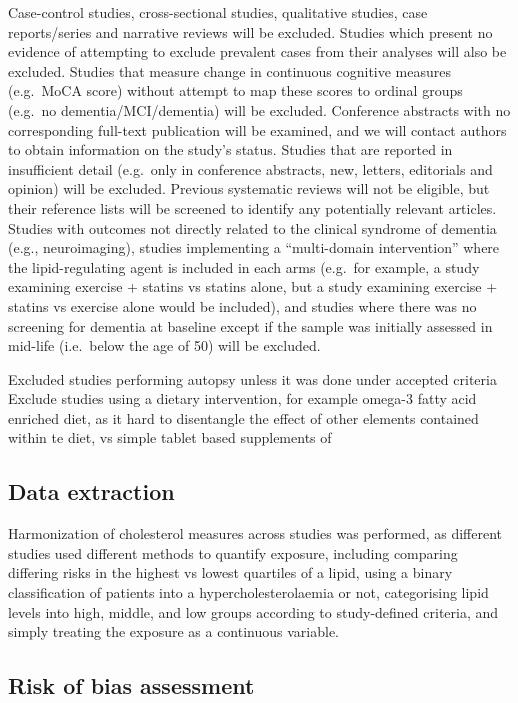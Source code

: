 \documentclass[a4paper, twoside]{templates/ociamthesis}
\begin{document}
Case-control studies, cross-sectional studies, qualitative studies, case reports/series and narrative reviews will be excluded. Studies which present no evidence of attempting to exclude prevalent cases from their analyses will also be excluded. Studies that measure change in continuous cognitive measures (e.g.~MoCA score) without attempt to map these scores to ordinal groups (e.g.~no dementia/MCI/dementia) will be excluded. Conference abstracts with no corresponding full-text publication will be examined, and we will contact authors to obtain information on the study's status. Studies that are reported in insufficient detail (e.g.~only in conference abstracts, new, letters, editorials and opinion) will be excluded. Previous systematic reviews will not be eligible, but their reference lists will be screened to identify any potentially relevant articles. Studies with outcomes not directly related to the clinical syndrome of dementia (e.g., neuroimaging), studies implementing a ``multi-domain intervention'' where the lipid-regulating agent is included in each arms (e.g.~for example, a study examining exercise + statins vs statins alone, but a study examining exercise + statins vs exercise alone would be included), and studies where there was no screening for dementia at baseline except if the sample was initially assessed in mid-life (i.e.~below the age of 50) will be excluded.

Excluded studies performing autopsy unless it was done under accepted criteria
Exclude studies using a dietary intervention, for example omega-3 fatty acid enriched diet, as it hard to disentangle the effect of other elements contained within te diet, vs simple tablet based supplements of

\hypertarget{data-extraction}{%
\subsection{Data extraction}\label{data-extraction}}

Harmonization of cholesterol measures across studies was performed, as different studies used different methods to quantify exposure, including comparing differing risks in the highest vs lowest quartiles of a lipid, using a binary classification of patients into a hypercholesterolaemia or not, categorising lipid levels into high, middle, and low groups according to study-defined criteria, and simply treating the exposure as a continuous variable.

\hypertarget{risk-of-bias-assessment}{%
\subsection{Risk of bias assessment}\label{risk-of-bias-assessment}}
\end{document}
